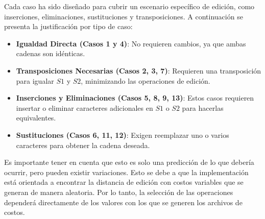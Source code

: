 Cada caso ha sido diseñado para cubrir un escenario específico de edición, como inserciones, eliminaciones, sustituciones y transposiciones. A continuación se presenta la justificación por tipo de caso:

\begin{itemize}
    \item \textbf{Igualdad Directa (Casos 1 y 4)}: No requieren cambios, ya que ambas cadenas son idénticas.
    \item \textbf{Transposiciones Necesarias (Casos 2, 3, 7)}: Requieren una transposición para igualar \( S1 \) y \( S2 \), minimizando las operaciones de edición.
    \item \textbf{Inserciones y Eliminaciones (Casos 5, 8, 9, 13)}: Estos casos requieren insertar o eliminar caracteres adicionales en \( S1 \) o \( S2 \) para hacerlas equivalentes.
    \item \textbf{Sustituciones (Casos 6, 11, 12)}: Exigen reemplazar uno o varios caracteres para obtener la cadena deseada.
\end{itemize}

Es importante tener en cuenta que esto es solo una predicción de lo que debería ocurrir, pero pueden existir variaciones. Esto se debe a que la implementación está orientada a encontrar la distancia de edición con costos variables que se generan de manera aleatoria. Por lo tanto, la selección de las operaciones dependerá directamente de los valores con los que se generen los archivos de costos.



